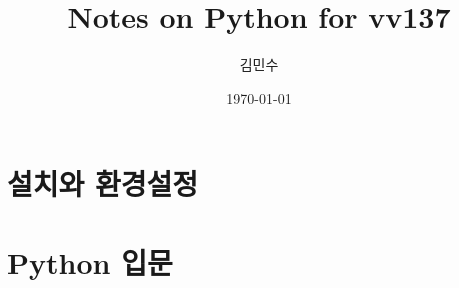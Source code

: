 \documentclass[
    ebook,
    10pt,
    oneside,
    openany,
    final
]{memoir}
\title{Notes on Python for vv137}
\author{김민수}
\date{\today}
\begin{document}
\frontmatter
\maketitle
\clearpage

\tableofcontents
\clearpage
\mainmatter

\part{설치와 환경설정}
%


\part{Python 입문}
%











\appendix

\backmatter
\end{document}

